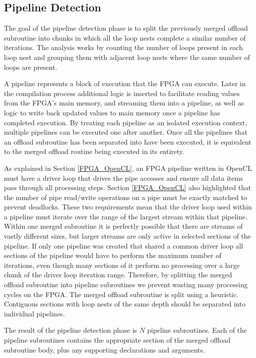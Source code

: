 \documentclass{mpaper}
\begin{document}
\subsection{Pipeline Detection}
\label{pipeline_detection}

The goal of the pipeline detection phase is to split the previously merged offload subroutine into chunks in which all the loop nests complete a similar number of iterations. 
The analysis works by counting the number of loops present in each loop nest and grouping them with adjacent loop nests where the same number of loops are present.

A pipeline represents a block of execution that the FPGA can execute.
Later in the compilation process additional logic is inserted to facilitate reading values from the FPGA's main memory, and streaming them into a pipeline, as well as logic to write back updated values to main memory once a pipeline has completed execution.
By treating each pipeline as an isolated execution context, multiple pipelines can be executed one after another. 
Once all the pipelines that an offload subroutine has been separated into have been executed, it is equivalent to the merged offload routine being executed in its entirety.

As explained in Section \ref{FPGA_OpenCL}, an FPGA pipeline written in OpenCL must have a driver loop that drives the pipe accesses and ensure all data items pass through all processing steps. 
Section \ref{FPGA_OpenCL} also highlighted that the number of pipe read/write operations on a pipe must be exactly matched to prevent deadlocks. 
These two requirements mean that the driver loop used within a pipeline must iterate over the range of the largest stream within that pipeline.
Within one merged subroutine it is perfectly possible that there are streams of vastly different sizes, but larger streams are only active in selected sections of the pipeline.
If only one pipeline was created that shared a common driver loop all sections of the pipeline would have to perform the maximum number of iterations, even though many sections of it perform no processing over a large chunk of the driver loop iteration range. 
Therefore, by splitting the merged offload subroutine into pipeline subroutines we prevent wasting many processing cycles on the FPGA. 
The merged offload subroutine is split using a heuristic. 
Contiguous sections with loop nests of the same depth should be separated into individual pipelines. 

The result of the pipeline detection phase is $N$ pipeline subroutines.
Each of the pipeline subroutines contains the appropriate section of the merged offload subroutine body, plus any supporting declarations and arguments.
\end{document}
